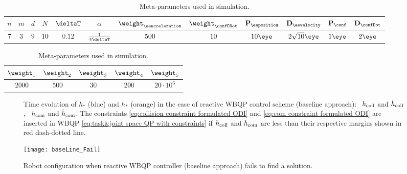 \begin{table}
	\centering
	\begin{tabular}{|c|c|c|c|c|c|c|c|c|c|c|c|}
		\hline
		$n$& $m$ & $d$& $N$ & $\deltaT$ & $\alpha$ & $\weight_{\eeacceleration}$ & $\weight_{\confDDot}$ & $\mathbf{P}_{\eeposition}$ & $\mathbf{D}_{\eevelocity}$ & $\mathbf{P}_{\conf}$ & $\mathbf{D}_{\confDot} $ \\ \hline
		$7$&$3$& $9$ &$10$ & $0.12$ & $\frac{1}{4\deltaT}$ &$500$&$10$& $10\eye$&$2\sqrt{10}\eye$ & $1\eye$    & $2\eye$   \\ \hline
	\end{tabular}
	\begin{tabular}{|c|c|c|c|c|}
		\hline
		$\weight_1$ & $\weight_2$ & $\weight_3$ & $\weight_{4}$ &  $\weight_{5}$\\ \hline
		$2000$     & $500$   & $30$  & $200$ & $20\cdot10^6 $   \\ \hline
	\end{tabular}
	\caption{Meta-parameters used in simulation.}
	\label{tab:MPC-QP parameters}
\end{table}
\begin{figure}
	\centering
	\caption{Time evolution of $h_{*}$ (blue) and $\dot{h}_{*}$ (orange) in the case of reactive WBQP  control scheme (baseline approach):~ $h_{\rm coll}$ and $\dot{h}_{\rm coll}$,~ $h_{\rm com}$ and $\dot{h}_{\rm com}$. The constraints \cref{eq:collision constraint formulated ODI} and \cref{eq:com constraint formulated ODI} are inserted in WBQP \cref{eq:task&joint space QP with constraints} if $h_{\rm coll}$ and $h_{\rm com}$ are less than their respective margins shown in red dash-dotted line.}
	\label{fig:hcoll and hcom time evolution-QP baseline}
\end{figure}
\begin{figure}
	\centering
	\texttt{[image: baseLine\_Fail]}
	\caption{Robot configuration when reactive WBQP controller (baseline approach) fails to find a solution.}
	\label{fig:robot fail}
\end{figure}


